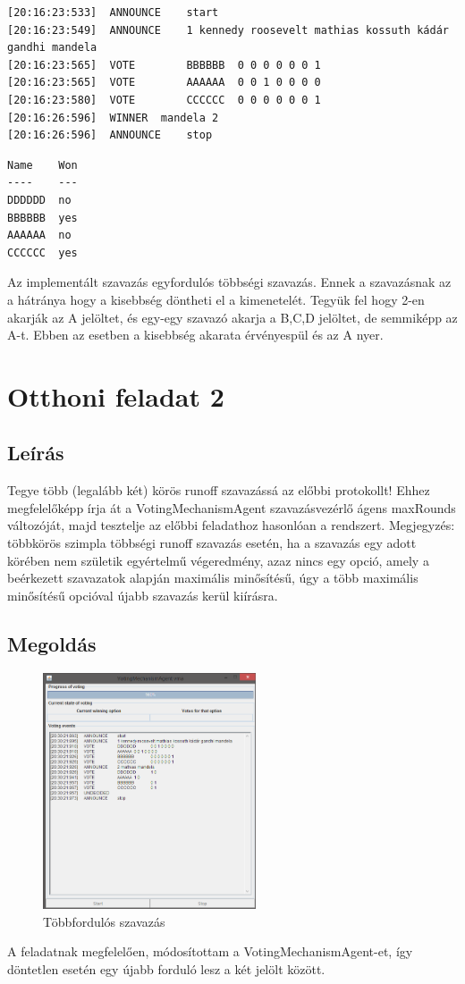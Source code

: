 \begin{lstlisting}[caption=A log.txt tartalma, frame=single,float=!ht]
[20:16:23:533]	ANNOUNCE	start
[20:16:23:549]	ANNOUNCE	1 kennedy roosevelt mathias kossuth kádár gandhi mandela
[20:16:23:565]	VOTE		BBBBBB	0 0 0 0 0 0 1
[20:16:23:565]	VOTE		AAAAAA	0 0 1 0 0 0 0
[20:16:23:580]	VOTE		CCCCCC	0 0 0 0 0 0 1
[20:16:26:596]	WINNER	mandela 2
[20:16:26:596]	ANNOUNCE	stop
\end{lstlisting}
\begin{lstlisting}[caption=A rest.txt tartalma, frame=single,float=!ht]
Name	Won
----	---
DDDDDD	no
BBBBBB	yes
AAAAAA	no
CCCCCC	yes
\end{lstlisting}

Az implementált szavazás egyfordulós többségi szavazás. Ennek a szavazásnak az a hátránya hogy a kisebbség döntheti el a kimenetelét. Tegyük fel hogy 2-en akarják az A jelöltet, és egy-egy szavazó akarja a B,C,D jelöltet, de semmiképp az A-t. Ebben az esetben a kisebbség akarata érvényespül és az A nyer.

\section{Otthoni feladat 2}
\subsection{Leírás}
Tegye több (legalább két) körös runoff szavazássá az előbbi protokollt! Ehhez
megfelelőképp írja át a  VotingMechanismAgent szavazásvezérlő ágens  maxRounds
változóját, majd tesztelje az előbbi feladathoz hasonlóan a rendszert.  Megjegyzés:
többkörös szimpla többségi runoff szavazás esetén, ha a szavazás egy adott körében nem születik
egyértelmű végeredmény, azaz nincs egy opció, amely a beérkezett szavazatok alapján maximális
minősítésű, úgy a több maximális minősítésű opcióval újabb szavazás kerül kiírásra.
\subsection{Megoldás}
\begin{figure}[!h]
\begin{center}
\includegraphics[height=7cm]{figures/ofel2.png}
\caption{Többfordulós szavazás}
\end{center}
\end{figure}
A feladatnak megfelelően, módosítottam a VotingMechanismAgent-et, így döntetlen esetén egy újabb forduló lesz a két jelölt között.

